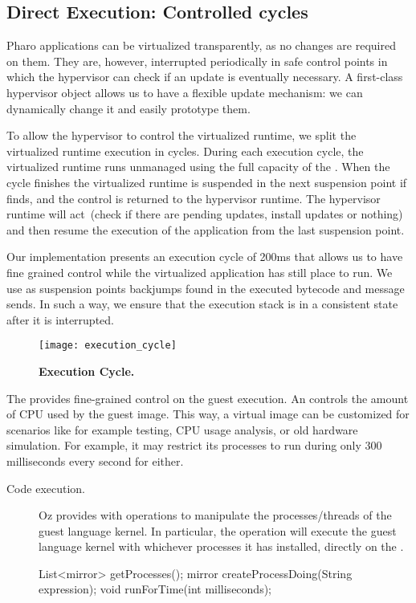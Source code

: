 \subsection{Direct \VM Execution: Controlled cycles}

Pharo applications can be virtualized transparently, as no changes are required on them. They are, however, interrupted periodically in safe control points in which the hypervisor can check if an update is eventually necessary. A first-class hypervisor object allows us to have a flexible update mechanism: we can dynamically change it and easily prototype them.

To allow the hypervisor to control the virtualized runtime, we split the virtualized runtime execution in cycles. During each execution cycle, the virtualized runtime runs unmanaged using the full capacity of the \VM. When the cycle finishes the virtualized runtime is suspended in the next suspension point if finds, and the control is returned to the hypervisor runtime. The hypervisor runtime will act~(check if there are pending updates, install updates or nothing) and then resume the execution of the application from the last suspension point.

Our implementation presents an execution cycle of 200ms that allows us to have fine grained control while the virtualized application has still place to run. We use as suspension points backjumps found in the executed bytecode and message sends. In such a way, we ensure that the execution stack is in a consistent state after it is interrupted.

\begin{figure}[ht]
\center
\texttt{[image: execution\_cycle]}
\caption{\textbf{Execution Cycle.} \label{fig:execution_cycle}}
\end{figure}

The \objectspace provides fine-grained control on the guest execution. An \objectspace controls the amount of CPU used by the guest image. This way, a virtual image can be customized for scenarios like for example testing, CPU usage analysis, or old hardware simulation. For example, it may restrict its processes to run during only 300 milliseconds every second for either.

\begin{description}
\item[Code execution.] Oz provides with operations to manipulate the processes/threads of the guest language kernel. In particular, the  operation will execute the guest language kernel with whichever processes it has installed, directly on the \VM.
\begin{code}
List<mirror> getProcesses();
mirror createProcessDoing(String expression);
void runForTime(int milliseconds);
\end{code}
\end{description}

